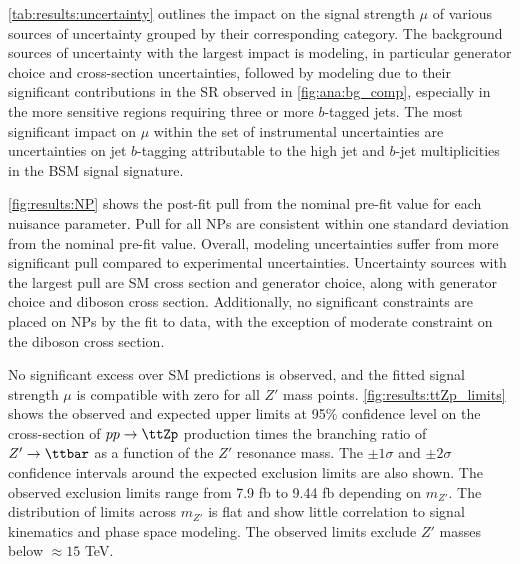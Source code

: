\documentclass[../thesis.tex]{subfiles}
\begin{document}
\autoref{tab:results:uncertainty} outlines the impact on the signal strength $\mu$ of various sources of uncertainty grouped by their corresponding category. The background sources of uncertainty with the largest impact is \tttt modeling, in particular \tttt generator choice and cross-section uncertainties, followed by \ttW modeling due to their significant contributions in the \acs{SR} observed in \autoref{fig:ana:bg_comp}, especially in the more sensitive regions requiring three or more $b$-tagged jets. The most significant impact on $\mu$ within the set of instrumental uncertainties are uncertainties on jet $b$-tagging attributable to the high jet and $b$-jet multiplicities in the \acs{BSM} \tttt signal signature.

\autoref{fig:results:NP} shows the post-fit pull from the nominal pre-fit value for each nuisance parameter. Pull for all \acs{NP}s are consistent within one standard deviation from the nominal pre-fit value. Overall, modeling uncertainties suffer from more significant pull compared to experimental uncertainties. Uncertainty sources with the largest pull are \acs{SM} \tttt cross section and generator choice, along with \ttZ generator choice and diboson cross section. Additionally, no significant constraints are placed on \acs{NP}s by the fit to data, with the exception of moderate constraint on the diboson cross section.

No significant excess over \acs{SM} predictions is observed, and the fitted signal strength $\mu$ is compatible with zero for all $Z'$ mass points. \autoref{fig:results:ttZp_limits} shows the observed and expected upper limits at 95\% confidence level on the cross-section of $pp\rightarrow\ttZp$ production times the branching ratio of $Z'\rightarrow\ttbar$ as a function of the $Z'$ resonance mass. The $\pm 1\sigma$ and $\pm 2\sigma$ confidence intervals around the expected exclusion limits are also shown. The observed exclusion limits range from 7.9 fb to 9.44 fb depending on $m_{Z'}$.
The distribution of limits across $m_{Z'}$ is flat and show little correlation to signal kinematics and phase space modeling.
The observed limits exclude $Z'$ masses below $\approx 15$ TeV.
\end{document}
